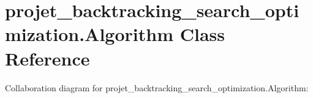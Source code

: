 \hypertarget{classprojet__backtracking__search__optimization_1_1_algorithm}{}\section{projet\+\_\+backtracking\+\_\+search\+\_\+optimization.\+Algorithm Class Reference}
\label{classprojet__backtracking__search__optimization_1_1_algorithm}


Collaboration diagram for projet\+\_\+backtracking\+\_\+search\+\_\+optimization.\+Algorithm\+:
